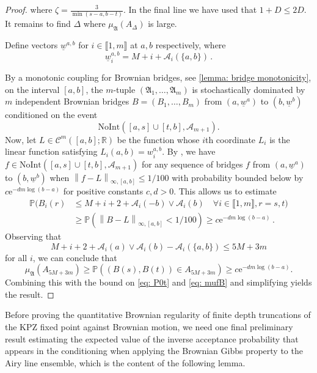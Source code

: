 \documentclass[11pt, reqno]{amsart}
\numberwithin{equation}{section}
\newcommand{\R}{\ensuremath{\mathbb{R}}}
\newcommand{\PP}{\ensuremath{\mathbb{P}}}
\newcommand{\norm}[1]{\left\lVert#1\right\rVert}
\begin{document}
\begin{proof}
where $\zeta = \frac{3}{\min(s-a, b-t)}$. In the final line we have used that $1 + D \le 2D$.
It remains to find $\Delta$ where $\mu_\mathfrak{A}(A_\Delta)$ is large.

Define vectors $\underline{w}^{a,b}$ for $i\in \llbracket 1, m \rrbracket$ at $a, b$ respectively, where 
\begin{equation*}
    \underline{w}_i^{a,b} =  M + i + \mathcal{A}_i(\{a, b\})\,.
\end{equation*}

 By a monotonic coupling for Brownian bridges, see \ref{lemma: bridge monotonicity}, on the interval $[a, b]$, the $m$-tuple $(\mathfrak{A}_{1}, \dots, \mathfrak{A}_{m})$ is stochastically dominated by $m$ independent Brownian bridges $B = (B_1, \dots, B_m)$ from $(a, \underline{w}^{a})$ to $(b, \underline{w}^{b})$ conditioned on the event
 $$
  \mathrm{NoInt}([a, s] \cup [t, b], \mathcal{A}_{m+1}).
 $$
 Now, let $L \in \mathscr{C}^m([a, b]; \R)$ be the function whose $i$th coordinate $L_i$ is the linear function satisfying $L_i(a,b) = w_i^{a, b}$. By \cite[Lemma 2.5]{dauvergne2024wienerdensitiesairyline}, we have $f \in  \mathrm{NoInt}([a, s] \cup [t, b], \mathcal{A}_{m+1})$ for any sequence of bridges $f$ from $(a, \underline{w}^{a})$ to $(b, \underline{w}^{b})$ when $\norm{f-L}_{\infty, [a,b]} \le 1/100$ with probability bounded below by $c\mathrm{e}^{-dm\log (b-a) }$ for positive constants $c,d> 0$. This allows us to estimate
 \begin{align*}
 \PP(B_i(r) &\le  M + i + 2 + \mathcal{A}_i(-b)\lor \mathcal{A}_i(b)\quad \forall i \in \llbracket 1, m \rrbracket, r = s, t)\\
 & \ge \PP(\norm{B-L}_{\infty, [a,b]} < 1/100)\ge c\mathrm{e}^{-d m\log (b-a)}\,.
 \end{align*}
 Observing that 
 $$
 M + i+ 2 + \mathcal{A}_i(a)\lor \mathcal{A}_i(b) - \mathcal{A}_i(\{a, b\})\le 5M+ 3m
 $$
 for all $i$, we can conclude that 
 $$
 \mu_\mathfrak{A}(A_{5M+3m}) \ge \PP((B(s), B(t)) \in A_{5M+3m}) \ge c\mathrm{e}^{-dm\log (b-a)}. 
 $$
 Combining this with the bound on \eqref{eq: P0t} and \eqref{eq: mufB} and simplifying yields the result.
\end{proof}

Before proving the quantitative Brownian regularity of finite depth truncations of the KPZ fixed point against Brownian motion, we need one final preliminary result estimating the expected value of the inverse acceptance probability that appears in the conditioning when applying the Brownian Gibbs property to the Airy line ensemble, which is the content of the following lemma.
\end{document}
